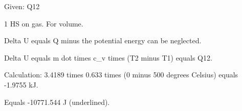 Given: Q12

1 HS on gas. For volume.

Delta U equals Q minus the potential energy can be neglected.

Delta U equals m dot times c_v times (T2 minus T1) equals Q12.

Calculation:
3.4189 times 0.633 times (0 minus 500 degrees Celsius) equals -1.9755 kJ.

Equals -10771.544 J (underlined).